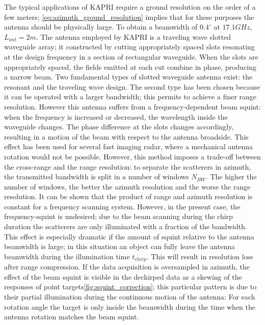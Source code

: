 The typical applications of KAPRI require a ground resolution on the order of a few meters; \autoref{eq:azimuth_ground_resolution} implies that for these purposes the antenna should be physically large. To obtain a beamwidth of $0.4^\circ$ at $17.1 GHz$, $L_{ant} = 2m$. The antenna employed by KAPRI is a traveling wave slotted waveguide array\cite{Hines1953a,Granet2007}; it constructed by cutting appropriately spaced slots resonating at the design frequency in a section of rectangular waveguide. When the slots are appropriately spaced, the fields emitted at each cut combine in phase, producing a narrow beam. Two fundamental types of slotted waveguide antenna exist\cite{Enjiu2013}: the resonant and the traveling wave design. The second type has been chosen because it can be operated with a larger bandwidth; this permits to achieve a finer range resolution. However this antenna suffers from a frequency-dependent beam squint: when the frequency is increased or decreased, the wavelength inside the waveguide changes. The phase difference at the slots changes accordingly, resulting in a motion of the beam with respect to the antenna broadside. This effect has been used for several fast imaging radar, where a mechanical antenna rotation would not be possible\cite{Yang2014,Yang2012,Mayer2003,Alvarez2013}. However, this method imposes a trade-off between the cross-range and the range resolution: to separate the scatterers in azimuth, the transmitted bandwidth is split in a number of windows $N_{BW}$. The higher the number of windows, the better the azimuth resolution and the worse the range resolution\cite{Alvarez2013}. It can be shown\cite{Mayer2003} that the product of range and azimuth resolution is constant for a frequency scanning system. However, in the present case, the frequency-squint is undesired; due to the beam scanning during the chirp duration the scatterers are only illuminated with a fraction of the bandwidth. This effect is especially dramatic if the amount of squint relative to the antenna beamwidth is large; in this situation an object can fully leave the antenna beamwidth during the illumination time $t_{chirp}$. This will result in resolution loss after range compression. If the data acquisition is oversampled in azimuth, the effect of the beam squint is visible in the dechirped data as a skewing of the responses of point targets\autoref{fig:squint_correction}; this particular pattern is due to their partial illumination during the continuous motion of the antenna: For each rotation angle the target is only inside the beamwidth during the time when the antenna rotation matches the beam squint. 
